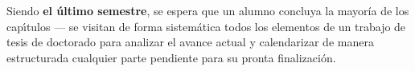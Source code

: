 \documentclass[10 pt]{article}
\begin{document}


Siendo {\bf el \'{u}ltimo semestre}, se espera que un alumno concluya la mayor\'{i}a
de los cap\'{\i}tulos --- se visitan de forma sistem\'{a}tica todos
los elementos de un trabajo de tesis de doctorado para analizar el
avance actual y calendarizar de manera estructurada cualquier parte
pendiente para su pronta finalizaci\'{o}n.


\end{document}
